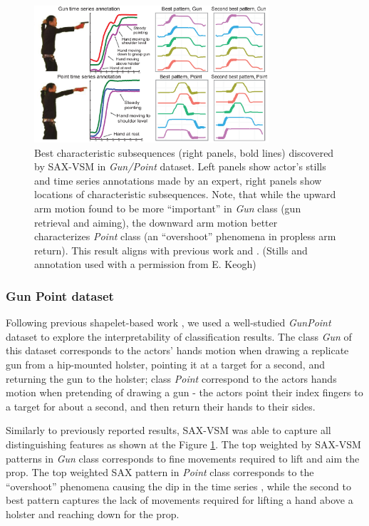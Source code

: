 \documentclass[conference]{IEEEtran}
\begin{document}
\begin{figure}[]
   \centering
   \includegraphics[width=87mm]{figures/gun-point.eps}
   \caption{Best characteristic subsequences (right panels, bold lines) discovered by 
   SAX-VSM in \textit{Gun/Point} dataset. 
   Left panels show actor's stills and time series annotations made by an expert, 
   right panels show locations of characteristic subsequences.
   Note, that while the upward arm motion found to be more ``important'' in \textit{Gun} 
   class (gun retrieval and aiming), the downward arm motion better characterizes 
   \textit{Point} class (an ``overshoot'' phenomena in propless arm return). 
   This result aligns with previous work \cite{shapelet} and \cite{bagnal}.
   (Stills and annotation used with a permission from E. Keogh) }
   \label{fig:shapelet-like-patterns}
   \vspace{-0.2cm}
\end{figure}

\subsubsection{Gun Point dataset}
Following previous shapelet-based work \cite{shapelet} \cite{bagnal}, 
we used a well-studied \textit{GunPoint} dataset \cite{gun} to explore the 
interpretability of classification results. The class \textit{Gun} of this dataset 
corresponds to the actors' hands motion when drawing a replicate gun from 
a hip-mounted holster, pointing it at a target for a second, and returning the 
gun to the holster; class \textit{Point} correspond to the actors hands motion 
when pretending of drawing a gun - the actors point their index fingers to 
a target for about a second, and then return their hands to their sides. 

Similarly to previously reported results, SAX-VSM was able to capture all 
distinguishing features as shown at the Figure \ref{fig:shapelet-like-patterns}. 
The top weighted by SAX-VSM patterns in \textit{Gun} class corresponds 
to fine movements required to lift and aim the prop. 
The top weighted SAX pattern in \textit{Point} class corresponds to the 
``overshoot'' phenomena causing the dip in the time series \cite{gun}, 
while the second to best pattern captures the lack of movements
required for lifting a hand above a holster and reaching down for the prop. 
\end{document}
